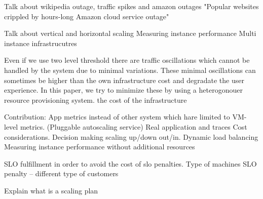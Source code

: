
Talk about wikipedia outage, traffic spikes and amazon outages "Popular websites crippled by hours-long Amazon cloud service outage"

Talk about vertical and horizontal scaling
Measuring instance performance
Multi instance infrastrucutres

Even if we use two level threshold there are traffic oscillations which cannot be handled by the system due to minimal variations. These minimal oscillations can sometimes be higher than the own infrastructure cost and degradate the user experience. In this paper, we try to minimize these by using a heterogonouer resource provisioning system. the cost of the infrastructure

Contribution:
App metrics instead of other system which hare limited to VM-level metrics. (Pluggable autoscaling service)
Real application and traces
Cost considerations.
Decision making scaling up/down out/in.
Dynamic load balancing
Measuring instance performance without additional resources

SLO fulfillment in order to avoid the cost of slo penalties.
Type of machines
SLO penalty -- different type of customers

Explain what is a scaling plan